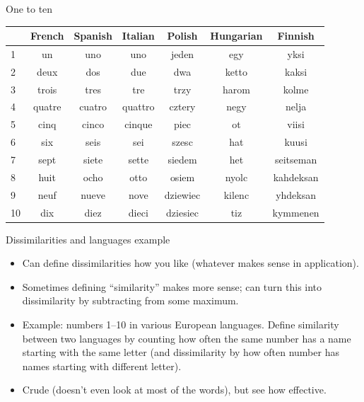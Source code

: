 \documentclass[ignorenonframetext,]{beamer}
\begin{document}
\begin{frame}{One to ten}
\protect\hypertarget{one-to-ten}{}

\begin{small}
\begin{tabular}{lcccccc}
& French & Spanish & Italian & Polish & Hungarian & Finnish\\
\hline
1 & un & uno & uno & jeden & egy & yksi\\
2 & deux & dos & due & dwa & ketto & kaksi\\
3 & trois & tres & tre & trzy &  harom & kolme\\
4 & quatre & cuatro & quattro & cztery & negy & nelja\\
5 & cinq & cinco & cinque & piec & ot & viisi\\
6 & six & seis & sei & szesc & hat & kuusi\\
7 & sept & siete & sette & siedem & het & seitseman \\
8 & huit & ocho & otto & osiem & nyolc & kahdeksan\\
9 & neuf & nueve & nove & dziewiec & kilenc & yhdeksan \\
10 & dix & diez & dieci & dziesiec & tiz & kymmenen\\
\hline
\end{tabular}
\end{small}

\end{frame}

\begin{frame}{Dissimilarities and languages example}
\protect\hypertarget{dissimilarities-and-languages-example}{}

\begin{itemize}
\item
  Can define dissimilarities how you like (whatever makes sense in
  application).
\item
  Sometimes defining ``similarity'' makes more sense; can turn this into
  dissimilarity by subtracting from some maximum.
\item
  Example: numbers 1--10 in various European languages. Define
  similarity between two languages by counting how often the same number
  has a name starting with the same letter (and dissimilarity by how
  often number has names starting with different letter).
\item
  Crude (doesn't even look at most of the words), but see how effective.
\end{itemize}

\end{frame}
\end{document}
